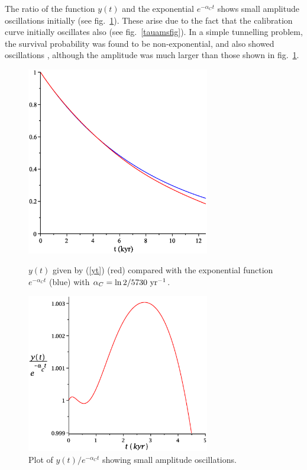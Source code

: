 \documentclass[12pt]{article}
\renewcommand{\Ref}[1]{(\ref{#1})}
\begin{document}
The ratio of the function $y(t)$ and the exponential 
$e^{-\alpha_Ct}$ shows small amplitude oscillations initially (see
fig.~\ref{oscill}). These arise due to the fact that the calibration 
curve initially
oscillates also (see fig.~\ref{tauamsfig}). In a simple tunnelling problem,
the survival probability was found to be non-exponential, and also showed
oscillations \cite{dicus02}, although the amplitude was much larger than
those shown in fig.~\ref{oscill}.

\begin{figure}[t] 
\centerline{\includegraphics[width=8cm]{Aston-Fig3.eps}}
\vspace{-2mm}
\caption{$y(t)$ given by \Ref{yt} (red) compared with
the exponential function $e^{-\alpha_C t}$ (blue) with $\alpha_C=
\ln 2/5730~{\rm yr}^{-1}$.}
\label{yplot}
\vspace{3mm}
\centerline{\includegraphics[width=8cm]{Aston-Fig4.eps}}
\vspace{-2mm} 
\caption{Plot of $y(t)/e^{-\alpha_Ct}$ showing small amplitude 
oscillations.}
\label{oscill} 
\end{figure}
\end{document}
